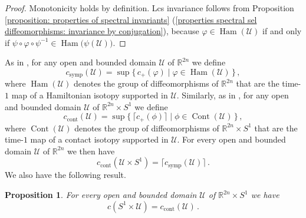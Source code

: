 \documentclass{amsart}
\DeclareMathOperator{\Ham}{Ham}
\DeclareMathOperator{\Cont}{Cont}
\DeclareMathOperator{\symp}{symp}
\DeclareMathOperator{\cont}{cont}
\newtheorem{prop}[thm]{Proposition}
\theoremstyle{remark}
\begin{document}
\begin{proof}
Monotonicity holds by definition.
Lcs invariance follows from
Proposition \ref{proposition: properties of spectral invariants}
(\ref{properties spectral sel diffeomorphisms: invariance by conjugation}),
because $\varphi \in \Ham (\mathcal{U})$ if and only if
$\psi \circ \varphi \circ \psi^{-1} \in \Ham \big(\psi (\mathcal{U}) \big)$.
\end{proof}

As in \cite{Viterbo},
for any open and bounded domain $\mathcal{U}$ of $\mathbb{R}^{2n}$
we define
\[
c_{\symp} (\mathcal{U})
= \sup \{\, c_+ (\varphi) \;\lvert \; \varphi \in \Ham (\mathcal{U})\,\} \,,
\]
where $\Ham (\mathcal{U})$ denotes
the group of diffeomorphisms of $\mathbb{R}^{2n}$
that are the time-$1$ map
of a Hamiltonian isotopy supported in $\mathcal{U}$.
Similarly,
as in \cite{San11},
for any open and bounded domain $\mathcal{U}$ of $\mathbb{R}^{2n} \times S^1$
we define
\[
c_{\cont} (\mathcal{U})
= \sup \{\, \lceil c_+ (\phi) \rceil \;\lvert \; \phi \in \Cont (\mathcal{U})\,\} \,,
\]
where $\Cont (\mathcal{U})$ denotes
the group of diffeomorphisms of $\mathbb{R}^{2n} \times S^1$
that are the time-$1$ map
of a contact isotopy supported in $\mathcal{U}$.
For every open and bounded domain $\mathcal{U}$ of $\mathbb{R}^{2n}$
we then have
\begin{equation}\label{equation: comparison capacities symplectic and contact}
c_{\cont} (\mathcal{U} \times S^1) = \lceil c_{\symp} (\mathcal{U}) \rceil \,.
\end{equation}
We also have the following result.

\begin{prop}\label{proposition: comparison capacities lcs contact}
For every open and bounded domain
$\mathcal{U}$ of $\mathbb{R}^{2n} \times S^1$
we have
\[
c (S^1 \times \mathcal{U}) = c_{\cont} (\mathcal{U}) \,.
\]
\end{prop}
\end{document}

